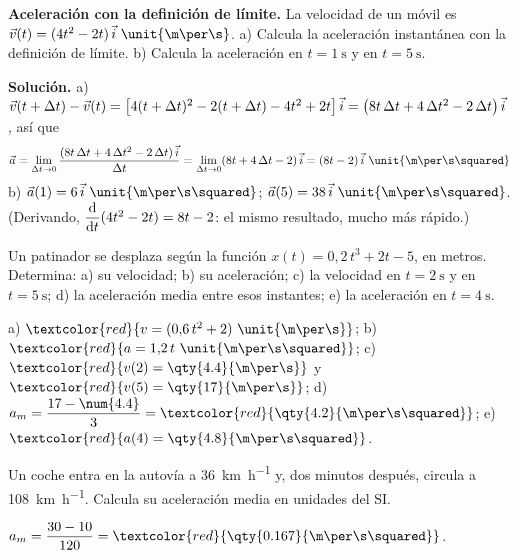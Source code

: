 \begin{example}
    \textbf{Aceleración con la definición de límite.} La velocidad de un móvil es \(\vec v(t) = (4t^2 - 2t)\,\ivec~\unit{\m\per\s}\).
    a) Calcula la aceleración instantánea con la definición de límite. b) Calcula la aceleración en \(t = \qty{1}{\s}\) y en
    \(t = \qty{5}{\s}\).

    \textbf{Solución.} a) \(\vec v(t + \Delta t) - \vec v(t) = \big[4(t + \Delta t)^2 - 2(t + \Delta t) - 4t^2 + 2t\big]\,\vec{i} =
    \big(8t\,\Delta t + 4\,\Delta t^2 - 2\,\Delta t\big)\,\vec{i}\), así que
    \[ \vec a = \lim_{\Delta t \to 0} \frac{(8t\,\Delta t + 4\,\Delta t^2 - 2\,\Delta t)\,\ivec}{\Delta t} =
       \lim_{\Delta t \to 0} (8t + 4\,\Delta t - 2)\,\ivec = (8t - 2)\,\ivec~\unit{\m\per\s\squared} \]
    b) \(\vec a(1) = 6\,\ivec~\unit{\m\per\s\squared}\); \(\vec a(5) = 38\,\ivec~\unit{\m\per\s\squared}\). (Derivando,
    \(\dfrac{\mathrm{d}}{\mathrm{d} t}(4t^2 - 2t) = 8t - 2\): el mismo resultado, mucho más rápido.)
\end{example}

\begin{exercise}
    Un patinador se desplaza según la función \(x(t) = 0{,}2\,t^3 + 2t - 5\), en metros. Determina: a) su velocidad; b) su
    aceleración; c) la velocidad en \(t = \qty{2}{\s}\) y en \(t = \qty{5}{\s}\); d) la aceleración media entre esos instantes;
    e) la aceleración en \(t = \qty{4}{\s}\).
    \begin{solu}
        a) \(\textcolor{red}{v = (0{,}6\,t^2 + 2)~\unit{\m\per\s}}\); b) \(\textcolor{red}{a = 1{,}2\,t~\unit{\m\per\s\squared}}\);
        c) \(\textcolor{red}{v(2) = \qty{4.4}{\m\per\s}}\) y \(\textcolor{red}{v(5) = \qty{17}{\m\per\s}}\);
        d) \(a_m = \dfrac{17 - \num{4.4}}{3} = \textcolor{red}{\qty{4.2}{\m\per\s\squared}}\); e) \(\textcolor{red}{a(4) = \qty{4.8}{\m\per\s\squared}}\).
    \end{solu}
\end{exercise}

\begin{exercise}
    Un coche entra en la autovía a \qty{36}{\km\per\hour} y, dos minutos después, circula a \qty{108}{\km\per\hour}. Calcula su
    aceleración media en unidades del SI.
    \begin{solu}
        \(a_m = \dfrac{30 - 10}{120} = \textcolor{red}{\qty{0.167}{\m\per\s\squared}}\).
    \end{solu}
\end{exercise}


